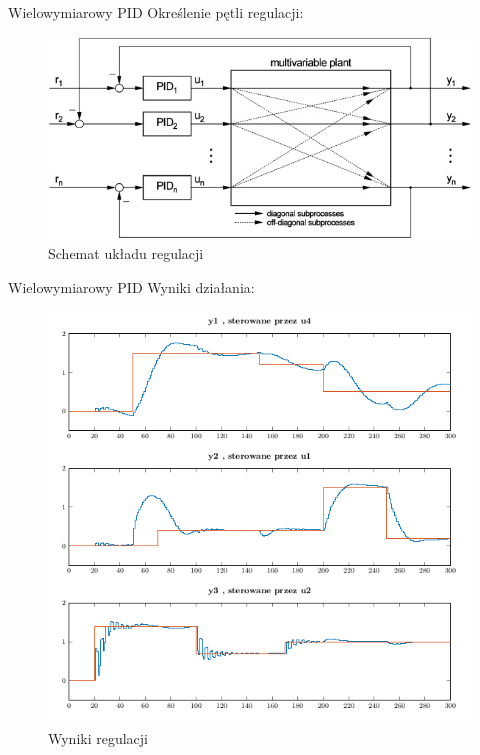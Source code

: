 \begin{frame}{Wielowymiarowy PID}
Określenie pętli regulacji:
	\begin{center}
		\begin{figure}[H]
            		\includegraphics[scale=0.7]{images/MPID.jpg}
          			 \caption{Schemat układu regulacji}
		\end{figure}
	\end{center}
\end{frame}

\begin{frame}{Wielowymiarowy PID}
Wyniki działania:
	\begin{center}
		\begin{figure}[H]
            		\includegraphics[scale=0.4]{images/innypid.png} %
          			 \caption{Wyniki regulacji}
		\end{figure}
	\end{center}
\end{frame}

